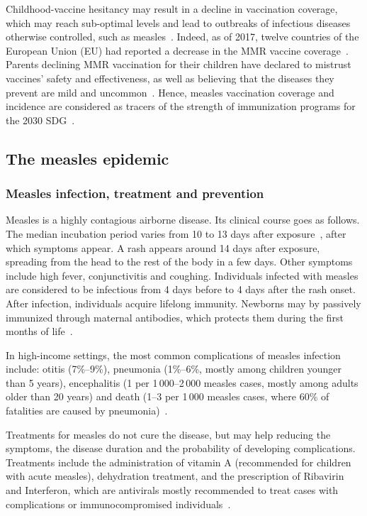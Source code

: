 Childhood-vaccine hesitancy may result in a decline in vaccination coverage, which may reach sub-optimal levels and lead to outbreaks of infectious diseases otherwise controlled, such as measles~\cite[]{Strebel2013}. Indeed, as of 2017, twelve countries of the European Union (EU) had reported a decrease in the MMR vaccine coverage~\cite[]{Larson2018}. Parents declining MMR vaccination for their children have declared to mistrust vaccines' safety and effectiveness, as well as believing that the diseases they prevent are mild and uncommon~\cite[]{Brown2010}. Hence, measles vaccination coverage and incidence are considered as tracers of the strength of immunization programs for the 2030 SDG~\cite[]{WHO_IA2030}. 
 

\subsection{The measles epidemic}
\subsubsection*{Measles infection, treatment and prevention}
Measles is a highly contagious airborne disease. Its clinical course goes as follows. The median incubation period varies from 10 to 13 days after exposure~\cite[]{CDC_Measles2015,Strebel2013}, after which symptoms appear. A rash appears around 14 days after exposure, spreading from the head to the rest of the body in a few days. Other symptoms include high fever, conjunctivitis and coughing. Individuals infected with measles are considered to be infectious from 4 days before to 4 days after the rash onset. After infection, individuals acquire lifelong immunity. Newborns may by passively immunized through maternal antibodies, which protects them during the first months of life~\cite[]{Strebel2013}.

In high-income settings, the most common complications of measles infection include: otitis (7\%--9\%), pneumonia (1\%--6\%, mostly among children younger than 5 years), encephalitis (1 per 1\,000--2\,000 measles cases, mostly among adults older than 20 years) and death (1--3 per 1\,000 measles cases, where 60\% of fatalities are caused by pneumonia)~\cite[]{Strebel2013}.

Treatments for measles do not cure the disease, but may help reducing the symptoms, the disease duration and the probability of developing complications. Treatments include the administration of vitamin A (recommended for children with acute measles), dehydration treatment, and the prescription of Ribavirin and Interferon, which are antivirals mostly recommended to treat cases with complications or immunocompromised individuals~\cite[]{Strebel2013}.

